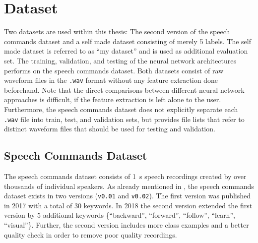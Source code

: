 
\section{Dataset}\label{sec:exp_dataset}
Two datasets are used within this thesis: The second version of the speech commands dataset \cite{Warden2018} and a self made dataset consisting of merely 5 labels.
The self made dataset is referred to as \enquote{my dataset} and is used as additional evaluation set.
The training, validation, and testing of the neural network architectures performs on the speech commands dataset.
Both datasets consist of raw waveform files in the \texttt{.wav} format without any feature extraction done beforehand.
Note that the direct comparisons between different neural network approaches is difficult, if the feature extraction is left alone to the user.
Furthermore, the speech commands dataset does not explicitly separate each \texttt{.wav} file into train, test, and validation sets, but provides file lists that refer to distinct waveform files that should be used for testing and validation.



\subsection{Speech Commands Dataset}\label{sec:exp_dataset_speech_cmd}
The speech commands dataset \cite{Warden2018} consists of \SI{1}{\second} speech recordings created by over thousands of individual speakers.
As already mentioned in , the speech commands dataset exists in two versions (\texttt{v0.01} and \texttt{v0.02}).
The first version was published in 2017 with a total of 30 keywords.
In 2018 the second version extended the first version by 5 additional keywords \{\enquote{backward}, \enquote{forward}, \enquote{follow}, \enquote{learn}, \enquote{visual}\}.
Further, the second version includes more class examples and a better quality check in order to remove poor quality recordings.

